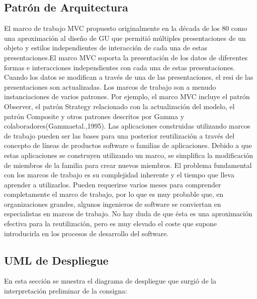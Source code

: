 \documentclass[10pt]{article} %
\begin{document}
\subsection{Patrón de Arquitectura}
El marco de trabajo MVC propuesto originalmente en la década de los 80 como una aproximación al diseño de GU que permitió múltiples presentaciones de un objeto y estilos independientes de interacción de cada una de estas presentaciones.El marco MVC soporta la presentación de los datos de diferentes formas e interacciones independientes con cada una de estas presentaciones. Cuando los datos se modifican a través de una de las presentaciones, el resi de las presentaciones son actualizadas.
Los marcos de trabajo son a menudo instanciaciones de varios patrones. Por ejemplo, el marco MVC incluye el patrón Observer, el patrón Strategy relacionado con la actualización del modelo, el patrón Composite y otros patrones descritos por Gamma y colaboradores(Gammaetal.,1995). 
Las aplicaciones construidas utilizando marcos de trabajo pueden ser las bases para una posterior reutilización a través del concepto de líneas de productos software o familias de aplicaciones. Debido a que estas aplicaciones se construyen utilizando un marco, se simplifica la modificación de miembros de la familia para crear nuevos miembros. 
El problema fundamental con los marcos de trabajo es su complejidad inherente y el tiempo que lleva aprender a utilizarlos. Pueden requerirse varios meses para comprender completamente el marco de trabajo, por lo que es muy probable que, en organizaciones grandes, algunos ingenieros de software se conviertan en especialistas en marcos de trabajo. No hay duda de que ésta es una aproximación efectiva para la reutilización, pero es muy elevado el coste que supone introducirla en los procesos de desarrollo del software.

\subsection{UML de Despliegue}
En esta sección se muestra el diagrama de despliegue que surgió de la interpretación preliminar de la consigna:
\end{document}
